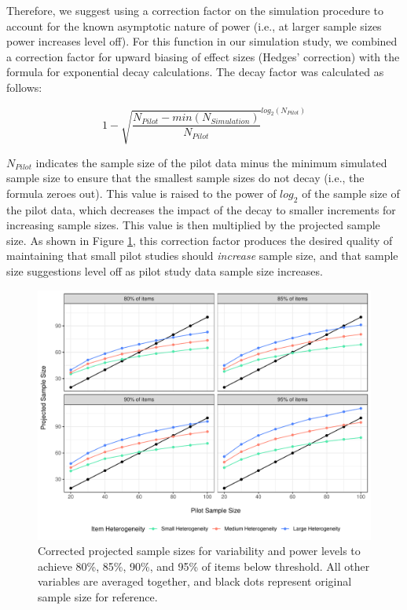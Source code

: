 \documentclass[
  man]{apa7}
\begin{document}
Therefore, we suggest using a correction factor on the simulation procedure to account for the known asymptotic nature of power (i.e., at larger sample sizes power increases level off). For this function in our simulation study, we combined a correction factor for upward biasing of effect sizes (Hedges' correction) with the formula for exponential decay calculations. The decay factor was calculated as follows:

\[ 1 - \sqrt{\frac{N_{Pilot} - min(N_{Simulation})}{N_{Pilot}}}^{log_2(N_{Pilot})}\]

\(N_{Pilot}\) indicates the sample size of the pilot data minus the minimum simulated sample size to ensure that the smallest sample sizes do not decay (i.e., the formula zeroes out). This value is raised to the power of \(log_2\) of the sample size of the pilot data, which decreases the impact of the decay to smaller increments for increasing sample sizes. This value is then multiplied by the projected sample size. As shown in Figure \ref{fig:corrected-figure}, this correction factor produces the desired quality of maintaining that small pilot studies should \emph{increase} sample size, and that sample size suggestions level off as pilot study data sample size increases.

\begin{figure}
\centering
\includegraphics{manuscript_draft_files/figure-latex/corrected-figure-1.pdf}
\caption{\label{fig:corrected-figure}Corrected projected sample sizes for variability and power levels to achieve 80\%, 85\%, 90\%, and 95\% of items below threshold. All other variables are averaged together, and black dots represent original sample size for reference.}
\end{figure}
\end{document}
